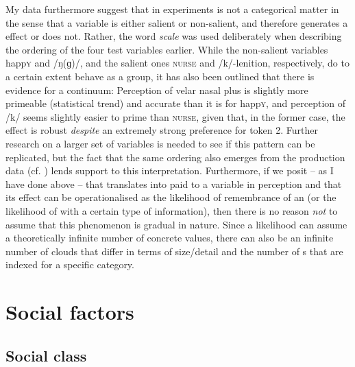 My data furthermore suggest that  in   experiments is not a categorical matter in the sense that a variable is either salient or non-salient, and therefore generates a  effect or does not.
Rather, the word \emph{scale} was used deliberately when describing the ordering of the four test variables earlier.
While the non-salient variables happ\textsc{y} and /ŋ(ɡ)/, and the salient ones \textsc{nurse} and /k/-lenition, respectively, do to a certain extent behave as a group, it has also been outlined that there is evidence for a continuum: Perception of velar nasal plus is slightly more primeable (statistical trend) and accurate than it is for happ\textsc{y}, and perception of /k/ seems slightly easier to prime than \textsc{nurse}, given that, in the former case, the effect is robust \emph{despite} an extremely strong preference for token 2.
Further research on a larger set of variables is needed to see if this pattern can be replicated, but the fact that the same ordering also emerges from the production data (cf. ) lends support to this interpretation.
Furthermore, if we posit -- as I have done above -- that  translates into  paid to a variable in perception and that its effect can be operationalised as the likelihood of remembrance of an  (or the likelihood of  with a certain type of information), then there is no reason \emph{not} to assume that this phenomenon is gradual in nature.
Since a likelihood can assume a theoretically infinite number of concrete values, there can also be an infinite number of  clouds that differ in terms of size/detail and the number of s that are indexed for a specific category.

	\section{Social factors}
		\label{sec.perc_res.disc.social}

		\subsection{Social class}

